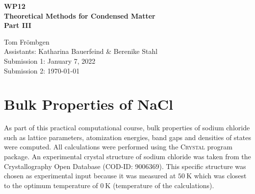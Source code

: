 \documentclass[a4paper,12pt,parskip=half]{scrartcl}
\begin{document}
%
\thispagestyle{empty}

%
\begin{center}
	\begin{LARGE}
		\vspace{50mm}
		\textbf{WP12} \\
		\vspace{15mm}
		\textbf{Theoretical Methods for Condensed Matter} \\
		\vspace{15mm}
		\textbf{Part III} \\
		\vspace{30mm}
	\end{LARGE}
	\begin{large}
		Tom Frömbgen \\
		\vspace{20mm}
		Assistants: Katharina Bauerfeind \& Berenike Stahl  \\
		\vspace{10mm}
		Submission 1: January 7, 2022 \\
		\vspace{5mm}
		Submission 2: \today \\
		\vspace{5mm}
	\end{large}
\end{center}

%
%
\newpage
{}
\section{Bulk Properties of NaCl}
%
As part of this practical computational course, bulk properties of sodium chloride such as lattice parameters, atomization energies, band gaps and densities of states were computed. All calculations were performed using the \textsc{Crystal} program package.\autocite[]{crystal-1, crystal-2} An experimental crystal structure of sodium chloride was taken from the Crystallography Open Database\autocite[]{cod} (COD-ID: 9006369). This specific structure was chosen as experimental input because it was measured at $ \SI{50}{\kelvin} $ which was closest to the optimum temperature of $ \SI{0}{\kelvin} $ (temperature of the calculations).
%
\end{document}
